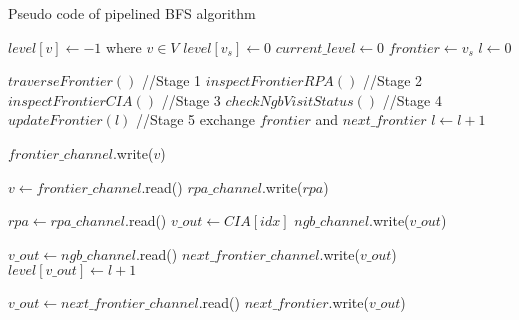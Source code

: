 \vspace{-0.5em}
\begin{algorithm}
	\caption{Pseudo code of pipelined BFS algorithm} \label{alg:bfs}
    \footnotesize
	\begin{algorithmic}[1]
		\State $level[v] \gets -1$ where $v \in V$
		\State $level[v_s] \gets 0$
		\State $current\_level \gets 0$
		\State $frontier \gets v_s$
		\State $l \gets 0$

		\State $traverseFrontier()$ {//Stage 1}
		\State $inspectFrontierRPA()$ {//Stage 2}
		\State $inspectFrontierCIA()$ {//Stage 3}
		\State $checkNgbVisitStatus()$ {//Stage 4}
		\State $updateFrontier(l)$ {//Stage 5}
		\State exchange $frontier$ and $next\_frontier$
		\State $l \gets l + 1$
		\EndWhile
		\EndProcedure

		\State $frontier\_channel$.write($v$)
		\EndFor
		\EndProcedure

		\State $v \gets frontier\_channel$.read()
		\State $rpa\_channel$.write($rpa$)
		\EndProcedure

		\State $rpa \gets rpa\_channel$.read()
		\State $v\_out \gets CIA[idx]$
		\State $ngb\_channel$.write($v\_out$)
		\EndFor
		\EndProcedure

		\State $v\_out \gets ngb\_channel$.read()
		\State $next\_frontier\_channel$.write($v\_out$)
		\State $level[v\_out] \gets l + 1$
		\EndIf
		\EndProcedure

		\State $v\_out \gets next\_frontier\_channel$.read()
		\State $next\_frontier$.write($v\_out$)
		\EndProcedure
	
	\end{algorithmic}
\end{algorithm}
\vspace{-1em}
